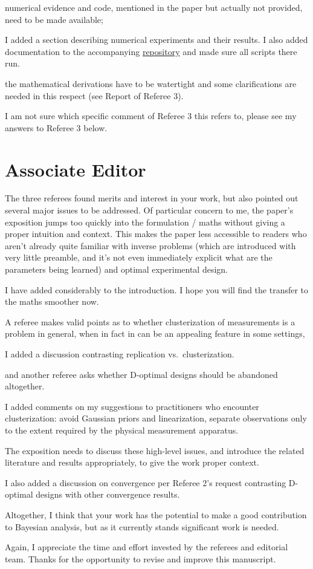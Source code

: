 \documentclass{article}
\begin{document}
\RC numerical evidence and code, mentioned in the paper but actually
not provided, need to be made available;
    
\AR I added a section describing numerical experiments and their
results. I also added documentation to the accompanying
\href{https://github.com/yairdaon/OED}{repository} and made sure all
scripts there run.

\RC the mathematical derivations have to be watertight and some
clarifications are needed in this respect (see Report of Referee 3).
  
\AR I am not sure which specific comment of Referee 3 this refers to,
please see my answers to Referee 3 below.
   

\section{Associate Editor}\label{ae}
\RC The three referees found merits and interest in your work, but also
pointed out several major issues to be addressed. Of particular
concern to me, the paper's exposition jumps too quickly into the
formulation / maths without giving a proper intuition and
context. This makes the paper less accessible to readers who aren't
already quite familiar with inverse problems (which are introduced
with very little preamble, and it's not even immediately explicit what
are the parameters being learned) and optimal experimental design.

\AR I have added considerably to the introduction. I hope you will
find the transfer to the maths smoother now.


\RC A referee makes valid points as to whether clusterization of
measurements is a problem in general, when in fact in can be an
appealing feature in some settings,

\AR I added a discussion contrasting replication vs.~clusterization.

\RC and another referee asks whether D-optimal designs should be
abandoned altogether.

\AR I added comments on my suggestions to practitioners who encounter
clusterization: avoid Gaussian priors and linearization, separate
observations only to the extent required by the physical measurement
apparatus.


\RC The exposition needs to discuss these high-level
issues, and introduce the related literature and results
appropriately, to give the work proper context.

\AR I also added a discussion on convergence per Referee 2's request
contrasting D-optimal designs with other convergence results.

\RC Altogether, I think that your work has the potential to make a
good contribution to Bayesian analysis, but as it currently stands
significant work is needed.

\AR Again, I appreciate the time and effort invested by the referees
and editorial team. Thanks for the opportunity to revise and improve this manuscript.










\end{document}
